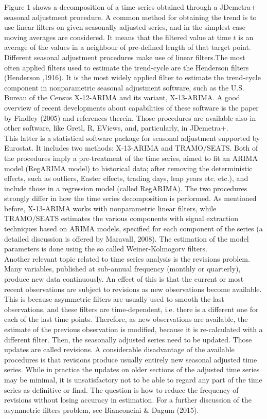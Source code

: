 \documentclass{article}
\begin{document}
Figure 1 shows a decomposition of a time series obtained through a JDemetra+ seasonal adjustment procedure. A common method for obtaining the trend is to use linear filters on given seasonally adjusted series, and in the simplest case moving averages are considered. It means that the filtered value at time $t$ is an average of the values in a neighbour of pre-defined length of that target point. Different seasonal adjustment procedures make use of linear filters.The most often applied filters used to estimate the trend-cycle are the Henderson filters (Henderson ,1916). It is the most widely applied filter to estimate the trend-cycle component in nonparametric seasonal adjustment software, such as the U.S. Bureau of the Census X-12-ARIMA and its variant, X-13-ARIMA. A good overview of recent developments about capabilities of these software is the paper by Findley (2005) and references therein. Those procedures are available also in other software, like Gretl, R, EViews, and, particularly, in JDemetra+.\\
This latter is  a statistical software package for seasonal adjustment supported by Eurostat. It includes two methods: X-13-ARIMA and TRAMO/SEATS. Both of the procedures imply a pre-treatment of the time series, aimed to fit an ARIMA model (RegARIMA model) to historical data; after removing the deterministic effects, such as outliers, Easter effects, trading days, leap years etc. etc.), and include those in a regression model  (called RegARIMA). The two procedures strongly differ in how the time series decomposition is performed. As mentioned before, X-13-ARIMA works with nonparametric linear filters, while TRAMO/SEATS estimates the various components with signal extraction techniques based on ARIMA models, specified for each component of the series (a detailed discussion is offered by Maravall, 2008). The estimation of the model parameters is done using the so called Weiner-Kolmogorv filters.\\
Another relevant topic related to time series analysis is the revisions problem. Many variables, published at sub-annual frequency (monthly or quarterly), produce new data continuously. An effect of this is that the current or most recent observations are subject to revisions as new observations become available. This is because asymmetric filters are usually used to smooth the last observations, and these filters are time-dependent, i.e. there is a different one for each of the last time points. Therefore, as new observations are available, the estimate of the previous observation is modified, because it is re-calculated with a different filter. Then, the seasonally adjusted series need to be updated. Those updates are called revisions. A considerable disadvantage of the available procedures is that revisions produce usually entirely new seasonal adjusted time series. While in practice the updates on older sections of the adjusted time series may be minimal, it is unsatisfactory not to be able to regard any part of the time series as definitive or final. The question is how to reduce the frequency of revisions without losing accuracy in estimation. For a further discussion of the asymmetric filters problem, see Bianconcini \& Dagum (2015).\\
\end{document}
